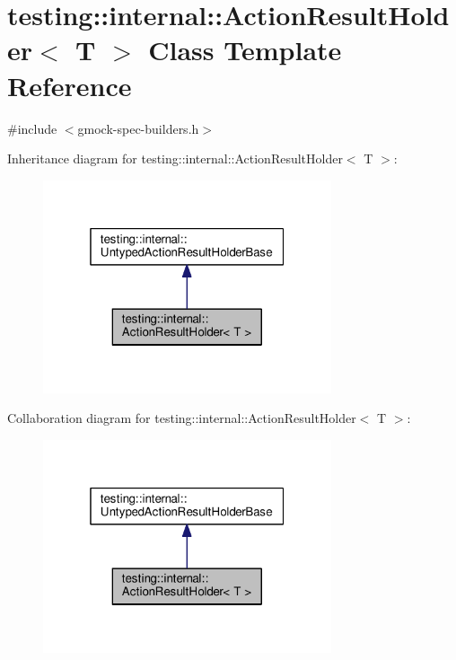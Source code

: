 \hypertarget{classtesting_1_1internal_1_1ActionResultHolder}{}\section{testing\+:\+:internal\+:\+:Action\+Result\+Holder$<$ T $>$ Class Template Reference}
\label{classtesting_1_1internal_1_1ActionResultHolder}


{\ttfamily \#include $<$gmock-\/spec-\/builders.\+h$>$}



Inheritance diagram for testing\+:\+:internal\+:\+:Action\+Result\+Holder$<$ T $>$\+:\nopagebreak
\begin{figure}[H]
\begin{center}
\leavevmode
\includegraphics[width=241pt]{classtesting_1_1internal_1_1ActionResultHolder__inherit__graph}
\end{center}
\end{figure}


Collaboration diagram for testing\+:\+:internal\+:\+:Action\+Result\+Holder$<$ T $>$\+:\nopagebreak
\begin{figure}[H]
\begin{center}
\leavevmode
\includegraphics[width=241pt]{classtesting_1_1internal_1_1ActionResultHolder__coll__graph}
\end{center}
\end{figure}
